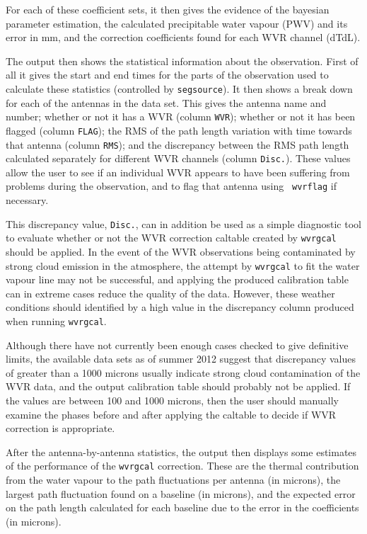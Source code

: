 For each of these coefficient sets, it then gives the evidence of the
bayesian parameter estimation, the calculated precipitable water
vapour (PWV) and its error in mm, and the correction coefficients
found for each WVR channel (dTdL).

The output then shows the statistical information about the
observation. First of all it gives the start and end times for the
parts of the observation used to calculate these statistics
(controlled by {\tt segsource}).  It then shows a break down for each
of the antennas in the data set. This gives the antenna name and
number; whether or not it has a WVR (column {\tt WVR}); whether or not
it has been flagged (column {\tt FLAG}); the RMS of the path length
variation with time towards that antenna (column {\tt RMS}); and the
discrepancy between the RMS path length calculated separately for
different WVR channels (column {\tt Disc.}). These values allow the
user to see if an individual WVR appears to have been suffering from
problems during the observation, and to flag that antenna using {\tt
  wvrflag} if necessary.

This discrepancy value, {\tt Disc.}, can in addition be used as a simple
diagnostic tool to evaluate whether or not the WVR correction caltable
created by {\tt wvrgcal} should be applied. In the event of the WVR
observations being contaminated by strong cloud emission in the
atmosphere, the attempt by {\tt wvrgcal} to fit the water vapour line
may not be successful, and applying the produced calibration table can
in extreme cases reduce the quality of the data. However, these
weather conditions should identified by a high value in the
discrepancy column produced when running {\tt wvrgcal}.

Although there have not currently been enough cases checked to give
definitive limits, the available data sets as of summer 2012 suggest
that discrepancy values of greater than a 1000 microns usually indicate
strong cloud contamination of the WVR data, and the output calibration
table should probably not be applied. If the values are between 100
and 1000 microns, then the user should manually examine the
phases before and after applying the caltable to decide if WVR
correction is appropriate.

After the antenna-by-antenna statistics, the output then displays some
estimates of the performance of the {\tt wvrgcal} correction. 
These are the thermal contribution from the water vapour to the path
fluctuations per antenna (in microns), the largest path fluctuation
found on a baseline (in microns), and the expected error on the path
length calculated for each baseline due to the error in the
coefficients (in microns). 



